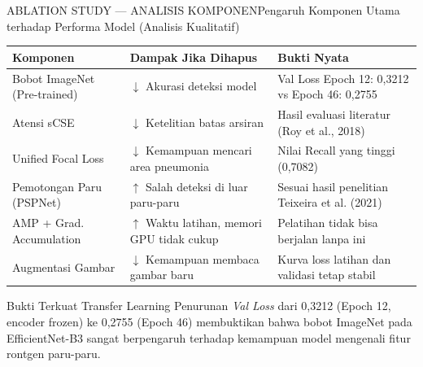 \documentclass[aspectratio=169,11pt]{beamer}
\begin{document}
\begin{frame}{ABLATION STUDY --- ANALISIS KOMPONEN}{Pengaruh Komponen Utama terhadap Performa Model (Analisis Kualitatif)}
\centering
\scriptsize
\begin{tabular}{p{3.5cm}p{4.5cm}p{4.5cm}}
  \toprule
  \textbf{Komponen} & \textbf{Dampak Jika Dihapus} & \textbf{Bukti Nyata} \\
  \midrule
  Bobot ImageNet (Pre-trained) & $\downarrow$ Akurasi deteksi model & Val Loss Epoch 12: 0,3212 vs Epoch 46: 0,2755 \\
  Atensi sCSE & $\downarrow$ Ketelitian batas arsiran & Hasil evaluasi literatur (Roy et al., 2018) \\
  Unified Focal Loss & $\downarrow$ Kemampuan mencari area pneumonia & Nilai Recall yang tinggi (0,7082) \\
  Pemotongan Paru (PSPNet) & $\uparrow$ Salah deteksi di luar paru-paru & Sesuai hasil penelitian Teixeira et al. (2021) \\
  AMP + Grad. Accumulation & $\uparrow$ Waktu latihan, memori GPU tidak cukup & Pelatihan tidak bisa berjalan lanpa ini \\
  Augmentasi Gambar & $\downarrow$ Kemampuan membaca gambar baru & Kurva loss latihan dan validasi tetap stabil \\
  \bottomrule
\end{tabular}

\vspace{0.1cm}
\begin{alertblock}{\footnotesize Bukti Terkuat Transfer Learning}
  \scriptsize Penurunan \textit{Val Loss} dari 0,3212 (Epoch 12, encoder frozen) ke 0,2755 (Epoch 46) membuktikan bahwa bobot ImageNet pada EfficientNet-B3 sangat berpengaruh terhadap kemampuan model mengenali fitur rontgen paru-paru.
\end{alertblock}
\end{frame}
\end{document}
